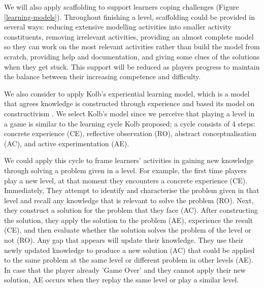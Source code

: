 \documentclass[12pt, a4paper]{report}
\begin{document}
{We will also apply scaffolding \cite{vygotsky1978mind, wood1976role} to support learners coping challenges (Figure \ref{learning-models}). Throughout finishing a level, scaffolding could be provided in several ways: reducing extensive modelling activities into smaller activity constituents, removing irrelevant activities, providing an almost complete model so they can work on the most relevant activities rather than build the model from scratch, providing help and documentation, and giving some clues of the solutions when they get stuck. This support will be reduced as players progress to maintain the balance between their increasing competence and difficulty.

We also consider to apply Kolb's experiential learning model, which is a model that agrees knowledge is constructed through experience and based its model on constructivism \cite{kolb2014experiential}. We select Kolb's model since we perceive that playing a level in a game is similar to the learning cycle Kolb proposed; a cycle consists of 4 steps: concrete experience (CE), reflective observation (RO), abstract conceptualisation (AC), and active experimentation (AE). 

We could apply this cycle to frame learners' activities in gaining new knowledge through solving a problem given in a level. For example, the first time players play a new level, at that moment they encounters a concrete experience (CE). Immediately, They attempt to identify and characterise the problem given in that level and recall any knowledge that is relevant to solve the problem (RO). Next, they construct a solution for the problem that they face (AC). After constructing the solution, they apply the solution to the problem (AE), experience the result (CE), and then evaluate whether the solution solves the problem of the level or not (RO). Any gap that appears will update their knowledge. They use their newly updated knowledge to produce a new solution (AC) that could be applied to the same problem at the same level or different problem in other levels (AE). In case that the player already 'Game Over' and they cannot apply their new solution, AE occurs when they replay the same level or play a similar level.

}
\end{document}
